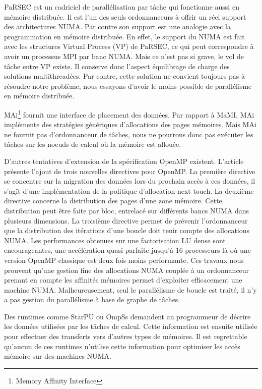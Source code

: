 PaRSEC est un cadriciel de parallélisation par tâche qui fonctionne aussi en mémoire distribuée.
%
Il est l'un des seuls ordonnanceurs à offrir un réel support des architectures NUMA.
%
Par contre son support est une analogie avec la programmation en mémoire distribuée.
%
En effet, le support du NUMA est fait avec les structures Virtual Process (VP) de PaRSEC, ce qui peut correspondre à avoir un processus MPI par banc NUMA.
%
Mais ce n'est pas si grave, le vol de tâche entre VP existe.
%
Il conserve donc l'aspect équilibrage de charge des solutions multithreadées.
%
Par contre, cette solution ne convient toujours pas à résoudre notre problème, nous essayons d'avoir le moins possible de parallélisme en mémoire distribuée.

MAi\footnote{Memory Affinity Interface}\cite{mai} fournit une interface de placement des données.
%
Par rapport à MaMI, MAi implémente des stratégies génériques d'allocations des pages mémoires.
%
Mais MAi ne fournit pas d'ordonnanceur de tâches, nous ne pourrons donc pas exécuter les tâches sur les noeuds de calcul où la mémoire est allouée.


D'autres tentatives d'extension de la spécification OpenMP existent.
%
L'article~\cite{openmp_numa} présente l'ajout de trois nouvelles directives pour OpenMP.
%
La première directive se concentre sur la migration des données lors du prochain accès à ces données, il s'agît d'une implémentation de la politique d'allocation next touch.
%
La deuxième directive concerne la distribution des pages d'une zone mémoire.
%
Cette distribution peut être faite par bloc, entrelacé sur différents bancs NUMA dans plusieurs dimensions.
%
La troisième directive permet de prévenir l'ordonnanceur que la distribution des itérations d'une boucle doit tenir compte des allocations NUMA.
%
Les performances obtenues sur une factorisation LU dense sont encourageantes, une accélération quasi parfaite jusqu'à 16 processeurs là où une version OpenMP classique est deux fois moins performante.
%
Ces travaux nous prouvent qu'une gestion fine des allocations NUMA couplée à un ordonnanceur prenant en compte les affinités mémoires permet d'exploiter efficacement une machine NUMA.
%
Malheureusement, seul le parallélisme de boucle est traité, il n'y a pas gestion du parallélisme à base de graphe de tâches.

Des runtimes comme StarPU ou OmpSs demandent au programmeur de décrire les données utilisées par les tâches de calcul.
%
Cette information est ensuite utilisée pour effectuer des transferts vers d'autres types de mémoires.
%
Il est regrettable qu'aucun de ces runtimes n'utilise cette information pour optimiser les accès mémoire sur des machines NUMA.
